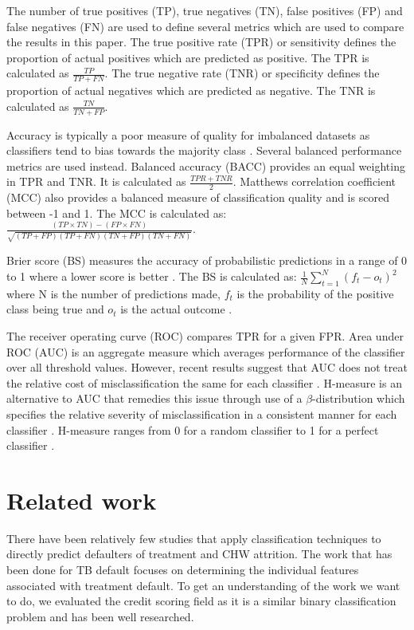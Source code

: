 \documentclass{sig-alternate-05-2015}
\begin{document}
	The number of true positives (TP), true negatives (TN), false positives (FP) and false negatives (FN) are used to define several metrics which are used to compare the results in this paper. The true positive rate (TPR) or sensitivity defines the proportion of actual positives which are predicted as positive. The TPR is calculated as $\frac{TP}{TP + FN}$. The true negative rate (TNR) or specificity defines the proportion of actual negatives which are predicted as negative. The TNR is calculated as $\frac{TN}{TN + FP}$. 
	
	Accuracy is typically a poor measure of quality for imbalanced datasets as classifiers tend to bias towards the majority class \cite{Batista:2004:SBS:1007730.1007735, Chawla:2004:ESI:1007730.1007733}. Several balanced performance metrics are used instead. Balanced accuracy (BACC) provides an equal weighting in TPR and TNR. It is calculated as $\frac{TPR + TNR}{2}$. Matthews correlation coefficient (MCC) also provides a balanced measure of classification quality and is scored between -1 and 1. The MCC is calculated as: $\frac{(TP \times TN) - (FP \times FN)}{\sqrt{(TP + FP)(TP + FN)(TN + FP)(TN + FN)}}$. 
	
	Brier score (BS) measures the accuracy of probabilistic predictions in a range of 0 to 1 where a lower score is better \cite{steyerberg2010assessing}. The BS is calculated as: $\frac{1}{N}\sum_{t=1}^{N}(f_t - o_t)^2$ where N is the number of predictions made, $f_t$ is the probability of the positive class being true and $o_t$ is the actual outcome \cite{steyerberg2010assessing}.
	
	The receiver operating curve (ROC) compares TPR for a given FPR. Area under ROC (AUC) is an aggregate measure which averages performance of the classifier over all threshold values. However, recent results suggest that AUC does not treat the relative cost of misclassification the same for each classifier \cite{Hand:2009:MCP:1612990.1613009}. H-measure is an alternative to AUC that remedies this issue through use of a $\beta$-distribution which specifies the relative severity of misclassification in a consistent manner for each classifier \cite{Hand:2009:MCP:1612990.1613009}. H-measure ranges from 0 for a random classifier to 1 for a perfect classifier \cite{Hand:2009:MCP:1612990.1613009}.
	
	\section{Related work}
	There have been relatively few studies that apply classification techniques to directly predict defaulters of treatment and CHW attrition. The work that has been done for TB default focuses on determining the individual features associated with treatment default. To get an understanding of the work we want to do, we evaluated the credit scoring field as it is a similar binary classification problem and has been well researched. 
\end{document}
